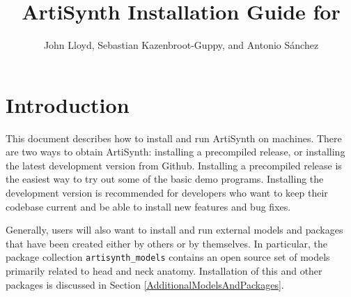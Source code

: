 \def\ArtHome[#1]{{\tt <ARTISYNTH\_HOME>#1}}

\title{ArtiSynth Installation Guide for \SYSTEM{}}
\author{John Lloyd, Sebastian Kazenbroot-Guppy, and Antonio S{\'a}nchez}
\iflatexml
\date{}
\fi

\newif\ifNeedLibraryPath
\NeedLibraryPathfalse



\maketitle

\iflatexml{\large\pubdate}\fi

\tableofcontents

\section{Introduction}

This document describes how to install and run ArtiSynth
on \FULLSYSTEM{} machines. There are two ways to obtain ArtiSynth:
installing a precompiled release, or installing the latest development
version from Github. Installing a precompiled release is the easiest
way to try out some of the basic demo programs. Installing the
development version is recommended for developers who want to keep
their codebase current and be able to install new features and bug
fixes.

%
%
%
%
%
%
%
%

Generally, users will also want to install and run external models and
packages that have been created either by others or by themselves.  In
particular, the package collection {\tt artisynth\_models} contains an
open source set of models primarily related to head and neck
anatomy. Installation of this and other packages is discussed in
Section \ref{AdditionalModelsAndPackages}.

